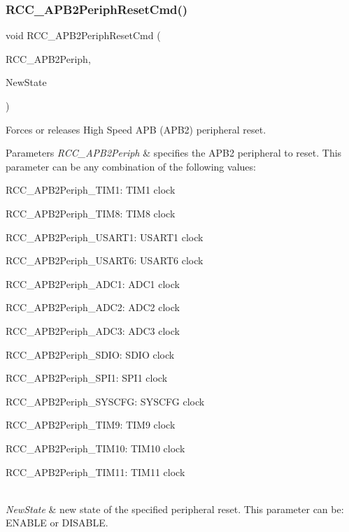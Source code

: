 \subsubsection{\texorpdfstring{R\+C\+C\+\_\+\+A\+P\+B2\+Periph\+Reset\+Cmd()}{RCC\_APB2PeriphResetCmd()}}
{\footnotesize\ttfamily void R\+C\+C\+\_\+\+A\+P\+B2\+Periph\+Reset\+Cmd (\begin{DoxyParamCaption}\item[{uint32\+\_\+t}]{R\+C\+C\+\_\+\+A\+P\+B2\+Periph,  }\item[{Functional\+State}]{New\+State }\end{DoxyParamCaption})}



Forces or releases High Speed A\+PB (A\+P\+B2) peripheral reset. 


\begin{DoxyParams}{Parameters}
{\em R\+C\+C\+\_\+\+A\+P\+B2\+Periph} & specifies the A\+P\+B2 peripheral to reset. This parameter can be any combination of the following values\+: \begin{DoxyItemize}
\item R\+C\+C\+\_\+\+A\+P\+B2\+Periph\+\_\+\+T\+I\+M1\+: T\+I\+M1 clock \item R\+C\+C\+\_\+\+A\+P\+B2\+Periph\+\_\+\+T\+I\+M8\+: T\+I\+M8 clock \item R\+C\+C\+\_\+\+A\+P\+B2\+Periph\+\_\+\+U\+S\+A\+R\+T1\+: U\+S\+A\+R\+T1 clock \item R\+C\+C\+\_\+\+A\+P\+B2\+Periph\+\_\+\+U\+S\+A\+R\+T6\+: U\+S\+A\+R\+T6 clock \item R\+C\+C\+\_\+\+A\+P\+B2\+Periph\+\_\+\+A\+D\+C1\+: A\+D\+C1 clock \item R\+C\+C\+\_\+\+A\+P\+B2\+Periph\+\_\+\+A\+D\+C2\+: A\+D\+C2 clock \item R\+C\+C\+\_\+\+A\+P\+B2\+Periph\+\_\+\+A\+D\+C3\+: A\+D\+C3 clock \item R\+C\+C\+\_\+\+A\+P\+B2\+Periph\+\_\+\+S\+D\+IO\+: S\+D\+IO clock \item R\+C\+C\+\_\+\+A\+P\+B2\+Periph\+\_\+\+S\+P\+I1\+: S\+P\+I1 clock \item R\+C\+C\+\_\+\+A\+P\+B2\+Periph\+\_\+\+S\+Y\+S\+C\+FG\+: S\+Y\+S\+C\+FG clock \item R\+C\+C\+\_\+\+A\+P\+B2\+Periph\+\_\+\+T\+I\+M9\+: T\+I\+M9 clock \item R\+C\+C\+\_\+\+A\+P\+B2\+Periph\+\_\+\+T\+I\+M10\+: T\+I\+M10 clock \item R\+C\+C\+\_\+\+A\+P\+B2\+Periph\+\_\+\+T\+I\+M11\+: T\+I\+M11 clock \end{DoxyItemize}
\\
\hline
{\em New\+State} & new state of the specified peripheral reset. This parameter can be\+: E\+N\+A\+B\+LE or D\+I\+S\+A\+B\+LE. \\
\hline
\end{DoxyParams}

